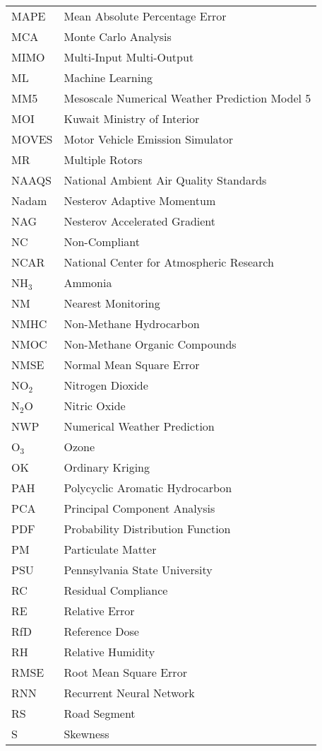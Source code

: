 \begin{longtable}{ll}
MAPE & Mean Absolute Percentage Error \\
MCA & Monte Carlo Analysis \\
MIMO & Multi-Input Multi-Output \\
ML & Machine Learning \\
MM5 & Mesoscale Numerical Weather Prediction Model 5 \\
MOI & Kuwait Ministry of Interior \\
MOVES & Motor Vehicle Emission Simulator \\
MR & Multiple Rotors \\
NAAQS & National Ambient Air Quality Standards \\
Nadam & Nesterov Adaptive Momentum \\
NAG & Nesterov Accelerated Gradient \\
NC & Non-Compliant \\
NCAR & National Center for Atmospheric Research \\
NH$_{3}$ & Ammonia \\
NM & Nearest Monitoring \\
NMHC & Non-Methane Hydrocarbon \\
NMOC & Non-Methane Organic Compounds \\
NMSE & Normal Mean Square Error \\
NO$_{2}$ & Nitrogen Dioxide \\
N$_{2}$O & Nitric Oxide \\
NWP & Numerical Weather Prediction \\
O$_{3}$ & Ozone \\
OK & Ordinary Kriging \\
PAH & Polycyclic Aromatic Hydrocarbon \\
PCA & Principal Component Analysis \\
PDF & Probability Distribution Function \\
PM & Particulate Matter \\
PSU & Pennsylvania State University \\
RC & Residual Compliance \\
RE & Relative Error \\
RfD & Reference Dose \\
RH & Relative Humidity \\
RMSE & Root Mean Square Error \\
RNN & Recurrent Neural Network \\
RS & Road Segment \\
S & Skewness \\

\end{longtable}
